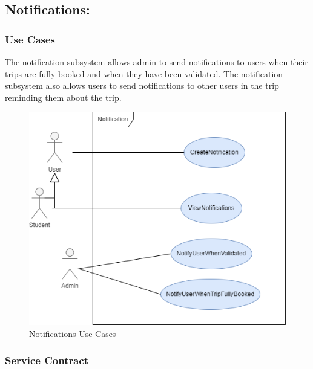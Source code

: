 \documentclass[hidelinks, 12pt, a4paper]{article}
\begin{document}
\newpage
\subsection{Notifications:}
\subsubsection{Use Cases}
The notification subsystem allows admin to send notifications to users when their trips are fully booked and when they have been validated. The notification subsystem also allows users to send notifications to other users in the trip reminding them about the trip.
\vspace{1cm}

\begin{figure}[H]

      \centering
      \includegraphics[]{images/Notification Usecase.drawio.png}
      \caption{Notifications Use Cases}
      \label{fig:User UseCases}

\end{figure}
\newpage
\subsubsection{Service Contract}
\end{document}
